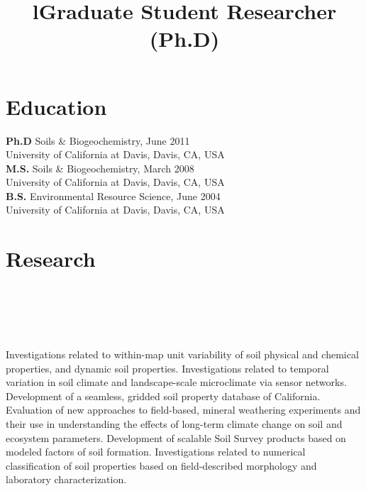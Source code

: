 \documentclass[overlapped,line,10pt,letterpaper]{res}
\begin{document}

\begin{resume}


\section{\bf Education}
\textbf{Ph.D } Soils \& Biogeochemistry, June 2011\\
University of California at Davis, Davis, CA, USA\\
\textbf{M.S.} Soils \& Biogeochemistry, March 2008\\
University of California at Davis, Davis, CA, USA\\
\textbf{B.S.} Environmental Resource Science, June 2004\\
University of California at Davis, Davis, CA, USA


\section{\bf Research}

\begin{format}
\\
\title{l}\\
\body\\
\end{format}


\title{Graduate Student Researcher (Ph.D)}
\begin{position}
Investigations related to within-map unit variability of soil physical and chemical properties, and dynamic soil properties. Investigations related to temporal variation in soil climate and landscape-scale microclimate via sensor networks. Development of a seamless, gridded soil property database of California. Evaluation of new approaches to field-based, mineral weathering experiments and their use in understanding the effects of long-term climate change on soil and ecosystem parameters. Development of scalable Soil Survey products based on modeled factors of soil formation. Investigations related to numerical classification of soil properties based on field-described morphology and laboratory characterization.
\end{position}


\end{resume}
\end{document}
